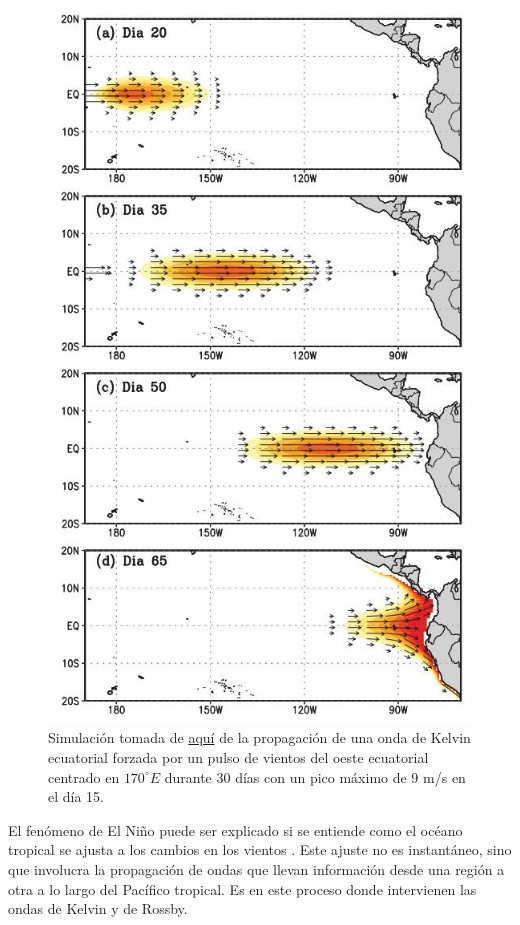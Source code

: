 \documentclass[12pt,dvipsnames]{exam}
\begin{document}
\begin{figure}[H]
\centering
\includegraphics[scale=0.4]{ni1.jpeg}
\caption{Simulación tomada de \href{http://www.met.igp.gob.pe/publicaciones/2014/Boletin_El_Nino_201401.pdf}{aquí} de la propagación de una
onda de Kelvin ecuatorial forzada por un pulso de vientos del oeste ecuatorial centrado en $170^{\circ}E$ durante 30 días con un pico máximo de 9 m/s en el día 15.} \label{ni1}
\end{figure}

El fenómeno de El Niño puede ser explicado si se entiende como el océano tropical se ajusta a los cambios en los vientos \cite{nii1}. Este ajuste no es instantáneo, sino que involucra la propagación de ondas que llevan información desde una región a otra a lo largo del Pacífico tropical. Es en este proceso donde intervienen las ondas de Kelvin y de Rossby.
\end{document}
